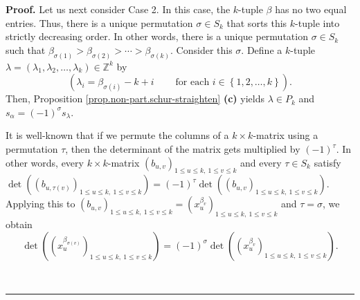 \documentclass[numbers=enddot,12pt,final,onecolumn,notitlepage]{scrartcl}%
\theoremstyle{definition}
\newenvironment{proof}[1][Proof]{\noindent\textbf{#1.} }{\ \rule{0.5em}{0.5em}}
\begin{document}
\begin{proof}
Let us next consider Case 2. In this case, the $k$-tuple $\beta$ has no two
equal entries. Thus, there is a unique permutation $\sigma\in S_{k}$ that
sorts this $k$-tuple into strictly decreasing order. In other words, there is
a unique permutation $\sigma\in S_{k}$ such that $\beta_{\sigma\left(
1\right)  }>\beta_{\sigma\left(  2\right)  }>\cdots>\beta_{\sigma\left(
k\right)  }$. Consider this $\sigma$. Define a $k$-tuple $\lambda=\left(
\lambda_{1},\lambda_{2},\ldots,\lambda_{k}\right)  \in\mathbb{Z}^{k}$ by%
\[
\left(  \lambda_{i}=\beta_{\sigma\left(  i\right)  }%
-k+i\ \ \ \ \ \ \ \ \ \ \text{for each }i\in\left\{  1,2,\ldots,k\right\}
\right)  .
\]
Then, Proposition \ref{prop.non-part.schur-straighten} \textbf{(c)} yields
$\lambda\in P_{k}$ and $s_{\alpha}=\left(  -1\right)  ^{\sigma}s_{\lambda}$.

It is well-known that if we permute the columns of a $k\times k$-matrix using
a permutation $\tau$, then the determinant of the matrix gets multiplied by
$\left(  -1\right)  ^{\tau}$. In other words, every $k\times k$-matrix
$\left(  b_{u,v}\right)  _{1\leq u\leq k,\ 1\leq v\leq k}$ and every $\tau\in
S_{k}$ satisfy $\det\left(  \left(  b_{u,\tau\left(  v\right)  }\right)
_{1\leq u\leq k,\ 1\leq v\leq k}\right)  =\left(  -1\right)  ^{\tau}%
\det\left(  \left(  b_{u,v}\right)  _{1\leq u\leq k,\ 1\leq v\leq k}\right)
$. Applying this to $\left(  b_{u,v}\right)  _{1\leq u\leq k,\ 1\leq v\leq
k}=\left(  x_{u}^{\beta_{v}}\right)  _{1\leq u\leq k,\ 1\leq v\leq k}$ and
$\tau=\sigma$, we obtain%
\begin{equation}
\det\left(  \left(  x_{u}^{\beta_{\sigma\left(  v\right)  }}\right)  _{1\leq
u\leq k,\ 1\leq v\leq k}\right)  =\left(  -1\right)  ^{\sigma}\det\left(
\left(  x_{u}^{\beta_{v}}\right)  _{1\leq u\leq k,\ 1\leq v\leq k}\right)  .
\label{pf.prop.non-part.bialternant.c2.3}%
\end{equation}



\end{proof}
\end{document}
